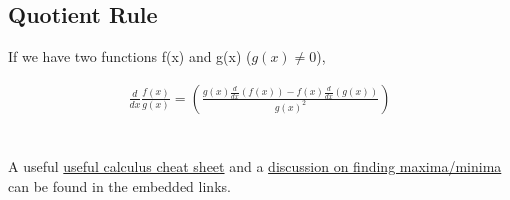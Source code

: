 \documentclass[12pt]{article}
\begin{document}
\subsection*{Quotient Rule}
If we have two functions f(x) and g(x) ($g(x)\neq 0$),

\begin{eqnarray*}
\frac{d}{dx}\frac{f(x)}{g(x)} = \left(\frac{g(x)\frac{d}{dx} (f(x)) - f(x)\frac{d}{dx} (g(x)) }{g(x)^{2}}\right)
\end{eqnarray*}
\\ \ \\
\noindent A useful \href{http://tutorial.math.lamar.edu/pdf/Calculus_Cheat_Sheet_Derivatives.pdf}{useful calculus cheat sheet} and a
\href{https://www.google.com/url?sa=t&rct=j&q=&esrc=s&source=web&cd=3&ved=0ahUKEwi32ZGPvbbPAhUCdj4KHcdyDZAQFggnMAI&url=http%3A%2F%2Fwww.math.psu.edu%2Ftseng%2Fclass%2FMath140A%2FNotes-First_and_Second_Derivative_Tests.doc&usg=AFQjCNEUih6RsfXq933pFwmoPk0yOvc1Mg&sig2=zyxh1-zWe7TY7zYwnhpH8g&cad=rja}{discussion on finding maxima/minima} can be found in the embedded links.
\end{document}
